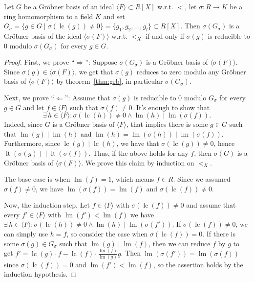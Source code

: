 \documentclass[a4paper, 12pt]{article}
\DeclareMathOperator{\LT}{lt}
\DeclareMathOperator{\LM}{lm}
\DeclareMathOperator{\LC}{lc}
\theoremstyle{changedot}
\theoremstyle{changedotbreak}
\theoremstyle{nonumberplain}
\newtheorem{proof}{Proof}
\begin{document}
\begin{lemma}\label{lem:grb_iff_reduc_to_z}
  Let $G$ be a Gröbner basis of an ideal $\langle F \rangle \subset R[X]$ w.r.t. $<$, let $\sigma : R \to K$ be a ring homomorphism to a field $K$ and set $G_{\sigma} = \{g \in G \mid \sigma(\LC(g)) \neq 0\} = \{g_{1}, g_{2}, \dots, g_{l}\} \subset R[X]$. Then $\sigma(G_{\sigma})$ is a Gröbner basis of the ideal $\langle \sigma(F) \rangle$ w.r.t. $<_{X}$ if and only if $\sigma(g)$ is reducible to 0 modulo $\sigma(G_{\sigma})$ for every $g \in G$.
\end{lemma}
\begin{proof}
  First, we prove ``$\Longrightarrow$'': Suppose $\sigma(G_{\sigma})$ is a Gröbner basis of $\langle \sigma(F) \rangle$. Since $\sigma(g) \in \langle \sigma(F) \rangle$, we get that $\sigma(g)$ reduces to zero modulo any Gröbner basis of $\langle \sigma(F) \rangle$ by theorem~\ref{thm:grb}, in particular $\sigma(G_{\sigma})$.

  Next, we prove ``$\Longleftarrow$'': Assume that $\sigma(g)$ is reducible to 0 modulo $G_{\sigma}$ for every $g \in G$ and let $f \in \langle F \rangle$ such that $\sigma(f) \neq 0$. It's enough to show that
  \[\exists\, h \in \langle F \rangle : \sigma(\LC(h)) \neq 0 \land \LM(h) \mid \LM(\sigma(f)).\]
  Indeed, since $G$ is a Gröbner basis of $\langle F \rangle$, that implies there is some $g \in G$ such that $\LM(g) \mid \LM(h)$ and $\LM(h) = \LM(\sigma(h)) \mid \LM(\sigma(f))$. Furthermore, since $\LC(g) \mid \LC(h)$, we have that $\sigma(\LC(g)) \neq 0$, hence $\LT(\sigma(g)) \mid \LT(\sigma(f))$. Thus, if the above holds for any $f$, then $\sigma(G)$ is a Gröbner basis of $\langle \sigma(F) \rangle$. We prove this claim by induction on $<_{X}$.

  The base case is when $\LM(f) = 1$, which means $f \in R$. Since we assumed $\sigma(f) \neq 0$, we have $\LM(\sigma(f)) = \LM(f)$ and $\sigma(\LC(f)) \neq 0$.

  Now, the induction step. Let $f \in \langle F \rangle$ with $\sigma(\LC(f)) \neq 0$ and assume that every $f' \in \langle F \rangle$ with $\LM(f') < \LM(f)$ we have $\exists\, h \in \langle F \rangle : \sigma(\LC(h)) \neq 0 \land \LM(h) \mid \LM(\sigma(f'))$. If $\sigma(\LC(f)) \neq 0$, we can simply use $h = f$, so consider the case when $\sigma(\LC(f)) = 0$. If there is some $\sigma(g) \in G_{\sigma}$ such that $\LM(g) \mid \LM(f)$, then we can reduce $f$ by $g$ to get $f' = \LC(g) \cdot f - \LC(f) \cdot \frac{\LM(f)}{\LM(g)}g$. Then $\LM(\sigma(f')) = \LM(\sigma(f))$ since $\sigma(\LC(f)) = 0$ and $\LM(f') < \LM(f)$, so the assertion holds by the induction hypothesis.


\end{proof}
\end{document}
